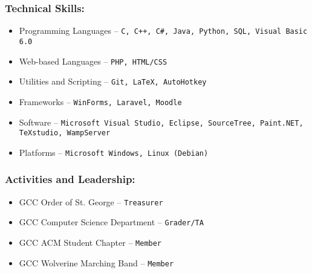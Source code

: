 \documentclass[12pt]{article}
\theoremstyle{plain} %
\theoremstyle{definition} %
\begin{document}
\subsubsection*{\color{head}Technical Skills:}
\begin{itemize}
	\item {\color{accent} Programming Languages} -- \texttt{C, C++, C\#, Java, Python, SQL, Visual Basic 6.0}
	\item {\color{accent} Web-based Languages} -- \texttt{PHP, HTML/CSS}
	\item {\color{accent} Utilities and Scripting} -- \texttt{Git, LaTeX, AutoHotkey}
	\item {\color{accent} Frameworks} -- \texttt{WinForms, Laravel, Moodle}
	\item {\color{accent} Software} -- \texttt{Microsoft Visual Studio, Eclipse, SourceTree, Paint.NET, TeXstudio, WampServer}
	\item {\color{accent} Platforms} -- \texttt{Microsoft Windows, Linux (Debian)}
\end{itemize}

\subsubsection*{\color{head}Activities and Leadership:}
\begin{itemize}
	\item {\color{accent} GCC Order of St. George} -- \texttt{Treasurer}
	\item {\color{accent} GCC Computer Science Department} -- \texttt{Grader/TA}
	\item {\color{accent} GCC ACM Student Chapter} -- \texttt{Member}
	\item {\color{accent} GCC Wolverine Marching Band} -- \texttt{Member}
\end{itemize}
\end{document}
